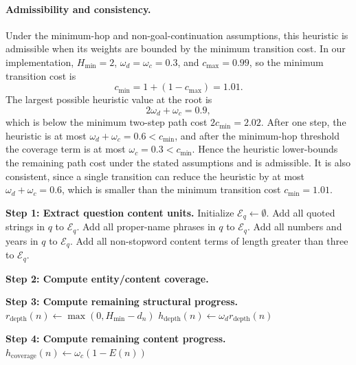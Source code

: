 \documentclass[11pt]{article}
\begin{document}
{\paragraph{Admissibility and consistency.}
Under the minimum-hop and non-goal-continuation assumptions, this
heuristic is admissible when its weights are bounded by the minimum
transition cost. In our implementation, \(H_{\min}=2\),
\(\omega_d=\omega_c=0.3\), and \(c_{\max}=0.99\), so the minimum
transition cost is
\[
c_{\min}=1+(1-c_{\max})=1.01.
\]
The largest possible heuristic value at the root is
\[
2\omega_d+\omega_c=0.9,
\]
which is below the minimum two-step path cost \(2c_{\min}=2.02\). After
one step, the heuristic is at most \(\omega_d+\omega_c=0.6<c_{\min}\),
and after the minimum-hop threshold the coverage term is at most
\(\omega_c=0.3<c_{\min}\). Hence the heuristic lower-bounds the remaining
path cost under the stated assumptions and is admissible. It is also
consistent, since a single transition can reduce the heuristic by at most
\(\omega_d+\omega_c=0.6\), which is smaller than the minimum transition
cost \(c_{\min}=1.01\).

\begin{algorithm}[t]
\caption{Dataset-Agnostic Symbolic Progress Heuristic}
\label{alg:symbolic-progress-heuristic}

\BlankLine
\textbf{Step 1: Extract question content units.}\;
Initialize \(\mathcal{E}_q \leftarrow \emptyset\).\;
Add all quoted strings in \(q\) to \(\mathcal{E}_q\).\;
Add all proper-name phrases in \(q\) to \(\mathcal{E}_q\).\;
Add all numbers and years in \(q\) to \(\mathcal{E}_q\).\;
Add all non-stopword content terms of length greater than three to \(\mathcal{E}_q\).\;

\BlankLine
\textbf{Step 2: Compute entity/content coverage.}\;

\BlankLine
\textbf{Step 3: Compute remaining structural progress.}\;
\(r_{\mathrm{depth}}(n) \leftarrow \max(0,H_{\min}-d_n)\)\;
\(h_{\mathrm{depth}}(n) \leftarrow \omega_d r_{\mathrm{depth}}(n)\)\;

\BlankLine
\textbf{Step 4: Compute remaining content progress.}\;
\(h_{\mathrm{coverage}}(n) \leftarrow \omega_c(1-E(n))\)\;


\end{algorithm}}
\end{document}
